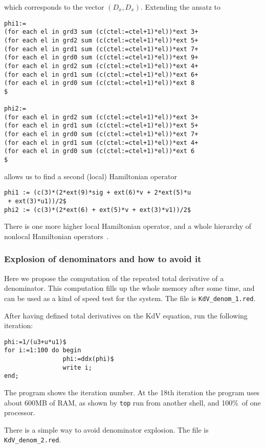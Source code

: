 which corresponds to the vector $(D_x,D_x)$.  Extending the ansatz to
\begin{verbatim}
phi1:=
(for each el in grd3 sum (c(ctel:=ctel+1)*el))*ext 3+
(for each el in grd2 sum (c(ctel:=ctel+1)*el))*ext 5+
(for each el in grd1 sum (c(ctel:=ctel+1)*el))*ext 7+
(for each el in grd0 sum (c(ctel:=ctel+1)*el))*ext 9+
(for each el in grd2 sum (c(ctel:=ctel+1)*el))*ext 4+
(for each el in grd1 sum (c(ctel:=ctel+1)*el))*ext 6+
(for each el in grd0 sum (c(ctel:=ctel+1)*el))*ext 8
$

phi2:=
(for each el in grd2 sum (c(ctel:=ctel+1)*el))*ext 3+
(for each el in grd1 sum (c(ctel:=ctel+1)*el))*ext 5+
(for each el in grd0 sum (c(ctel:=ctel+1)*el))*ext 7+
(for each el in grd1 sum (c(ctel:=ctel+1)*el))*ext 4+
(for each el in grd0 sum (c(ctel:=ctel+1)*el))*ext 6
$
\end{verbatim}
allows us to find a second (local) Hamiltonian operator
\begin{verbatim}
phi1 := (c(3)*(2*ext(9)*sig + ext(6)*v + 2*ext(5)*u
 + ext(3)*u1))/2$
phi2 := (c(3)*(2*ext(6) + ext(5)*v + ext(3)*v1))/2$
\end{verbatim}
There is one more higher local Hamiltonian operator, and a whole hierarchy of
nonlocal Hamiltonian operators~\cite{KerstenKrasilshchikVerboretsky:2004}.


\subsubsection{Explosion of denominators and how to avoid it}

Here we propose the computation of the repeated total derivative of a
denominator. This computation fills up the whole memory after some time, and
can be used as a kind of speed test for the system. The file is
\texttt{KdV\_denom\_1.red}.

After having defined total derivatives on the KdV equation, run the following
iteration:
\begin{verbatim}
phi:=1/(u3+u*u1)$
for i:=1:100 do begin
                phi:=ddx(phi)$
                write i;
end;
\end{verbatim}
The program shows the iteration number. At the 18th iteration the program uses
about 600MB of RAM, as shown by \texttt{top} run from another shell, and 100\%\
of one processor.

There is a simple way to avoid denominator explosion. The file is
\texttt{KdV\_denom\_2.red}.

